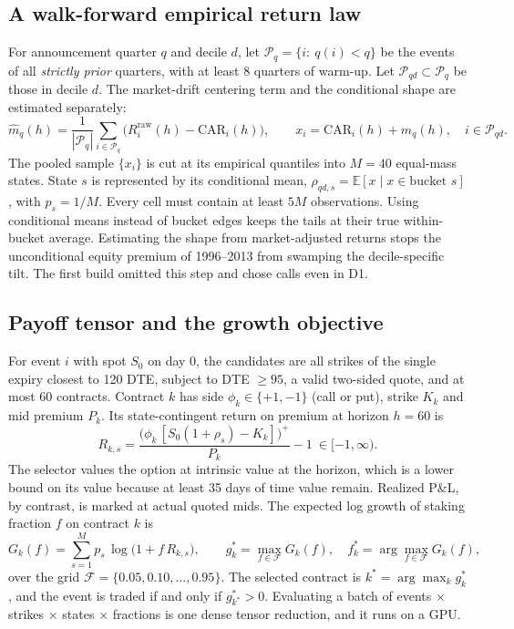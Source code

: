 \documentclass[11pt]{article}
\theoremstyle{definition}
\newcommand{\E}{\mathbb{E}}
\newcommand{\1}{\mathbf{1}}
\newcommand{\F}{\mathcal{F}}
\begin{document}
\subsection{A walk-forward empirical return law}

For announcement quarter $q$ and decile $d$, let $\mathcal{P}_{q}=\{i:\ q(i)<q\}$ be the
events of all \emph{strictly prior} quarters, with at least 8 quarters of warm-up. Let
$\mathcal{P}_{qd}\subset\mathcal{P}_q$ be those in decile $d$. The market-drift centering
term and the conditional shape are estimated separately:
\begin{equation}
  \hat m_q(h)=\frac{1}{|\mathcal{P}_q|}\sum_{i\in\mathcal{P}_q}\big(R^{\text{raw}}_i(h)-\mathrm{CAR}_i(h)\big),\qquad
  x_i=\mathrm{CAR}_i(h)+\hat m_q(h),\quad i\in\mathcal{P}_{qd}.
\end{equation}
The pooled sample $\{x_i\}$ is cut at its empirical quantiles into $M=40$ equal-mass states.
State $s$ is represented by its conditional mean,
$\rho_{qd,s}=\E[x\mid x\in\text{bucket } s]$, with $p_s=1/M$. Every cell must contain at least
$5M$ observations. Using conditional means instead of bucket edges keeps the tails at their
true within-bucket average. Estimating the shape from market-adjusted returns stops the
unconditional equity premium of 1996--2013 from swamping the decile-specific tilt. The
first build omitted this step and chose calls even in D1.

\subsection{Payoff tensor and the growth objective}

For event $i$ with spot $S_0$ on day 0, the candidates are all strikes of the single
expiry closest to 120 DTE, subject to DTE $\ge 95$, a valid two-sided quote, and at most 60
contracts. Contract $k$ has side $\phi_k\in\{+1,-1\}$ (call or put), strike $K_k$ and mid
premium $P_k$. Its state-contingent return on premium at horizon $h=60$ is
\begin{equation}
  R_{k,s}=\frac{\big(\phi_k\,[S_0(1+\rho_s)-K_k]\big)^+}{P_k}-1\ \in[-1,\infty).
  \label{eq:payoff}
\end{equation}
The selector values the option at intrinsic value at the horizon, which is a lower bound on
its value because at least 35 days of time value remain. Realized P\&L, by contrast, is
marked at actual quoted mids. The expected log growth of staking fraction $f$ on contract $k$ is
\begin{equation}
  G_k(f)=\sum_{s=1}^{M}p_s\,\log\big(1+f\,R_{k,s}\big),\qquad
  g^\ast_k=\max_{f\in\F}G_k(f),\quad f^\ast_k=\arg\max_{f\in\F}G_k(f),
\end{equation}
over the grid $\F=\{0.05,0.10,\dots,0.95\}$. The selected contract is
$k^\ast=\arg\max_k g^\ast_k$, and the event is traded if and only if $g^\ast_{k^\ast}>0$.
Evaluating a batch of events $\times$ strikes $\times$ states $\times$ fractions is one dense
tensor reduction, and it runs on a GPU.
\end{document}
